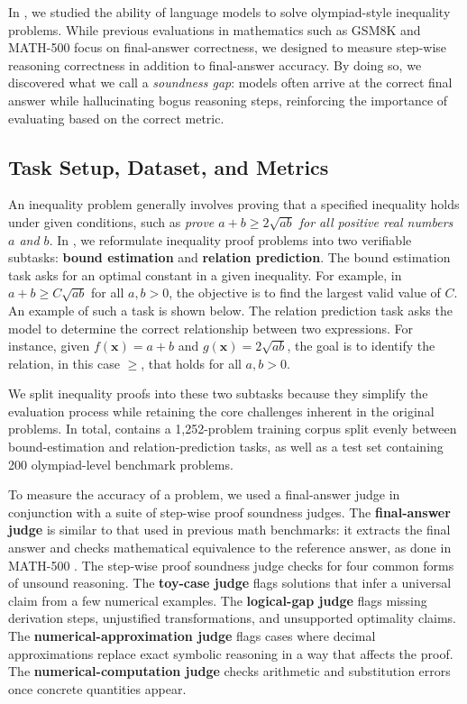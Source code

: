 

In \dataset, we studied the ability of language models to solve olympiad-style inequality
problems. While previous evaluations in mathematics such as GSM8K \cite{cobbe2021training} and
MATH-500 \cite{hendrycks2021measuring} focus on final-answer correctness, we designed \dataset
to measure step-wise reasoning correctness in addition to final-answer accuracy. By doing so,
we discovered what we call a \emph{soundness gap}: models often arrive at the correct final answer
while hallucinating bogus reasoning steps, reinforcing the importance of evaluating based on the
correct metric.

\subsection{Task Setup, Dataset, and Metrics}
An inequality problem generally involves proving that a specified inequality
holds under given conditions, such as \textit{prove $a + b \geq 2\sqrt{ab}$ for all
positive real numbers $a$ and $b$}. In \dataset, we reformulate inequality proof problems into two verifiable
subtasks: \textbf{bound estimation} and \textbf{relation prediction}. The bound
estimation task asks for an optimal constant in a given inequality. For example,
in $a + b \geq C\sqrt{ab}$ for all $a,b>0$, the objective is to find the largest
valid value of $C$. An example of such a task is shown below.
The relation prediction task asks the model to determine
the correct relationship between two expressions. For instance, given
$f(\mathbf{x})=a+b$ and $g(\mathbf{x})=2\sqrt{ab}$, the goal is to identify the
relation, in this case $\ge$, that holds for all $a,b>0$.



We split inequality proofs into these two subtasks because
they simplify the evaluation process while retaining the core challenges inherent
in the original problems. In total, \dataset contains a 1,252-problem training corpus
split evenly between bound-estimation and relation-prediction tasks, as well as a
test set containing 200 olympiad-level benchmark problems.

To measure the accuracy of a problem, we used a final-answer judge in conjunction
with a suite of step-wise proof soundness judges.
The \textbf{final-answer judge} is similar to that used in previous math benchmarks:
it extracts the final answer and checks mathematical equivalence to the
reference answer, as done in MATH-500 \citep{hendrycks2021-apps}.
The step-wise proof soundness judge checks for four common forms of unsound
reasoning. The \textbf{toy-case judge} flags solutions that infer a universal
claim from a few numerical examples. The \textbf{logical-gap judge} flags
missing derivation steps, unjustified transformations, and unsupported
optimality claims. The \textbf{numerical-approximation judge} flags cases where
decimal approximations replace exact symbolic reasoning in a way that affects
the proof. The \textbf{numerical-computation judge} checks arithmetic and
substitution errors once concrete quantities appear.

